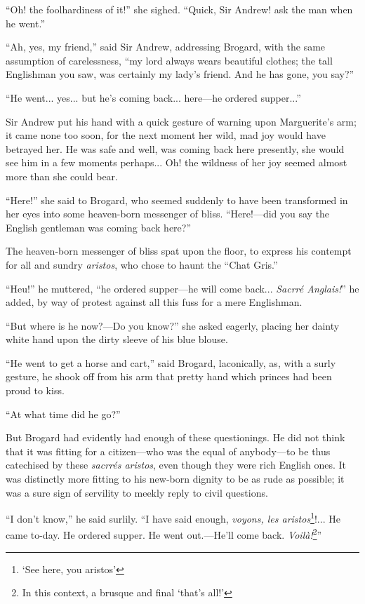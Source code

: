 \documentclass[paper=a5,BCOR=7mm,twoside,DIV=calc,12pt,usegeometry,chapterprefix,endperiod,headings=big]{scrbook}
\begin{document}
\enquote{Oh! the foolhardiness of it!} she sighed. \enquote{Quick, Sir Andrew! ask the man when he went.}

\enquote{Ah, yes, my friend,} said Sir Andrew, addressing Brogard, with the same assumption of carelessness, \enquote{my lord always wears beautiful clothes; the tall Englishman you saw, was certainly my lady's friend. And he has gone, you say?}

\enquote{He went... yes... but he's coming back... here---he ordered supper...}

Sir Andrew put his hand with a quick gesture of warning upon Marguerite's arm; it came none too soon, for the next moment her wild, mad joy would have betrayed her. He was safe and well, was coming back here presently, she would see him in a few moments perhaps... Oh! the wildness of her joy seemed almost more than she could bear.

\enquote{Here!} she said to Brogard, who seemed suddenly to have been transformed in her eyes into some heaven-born messenger of bliss. \enquote{Here!---did you say the English gentleman was coming back here?}

The heaven-born messenger of bliss spat upon the floor, to express his contempt for all and sundry \textit{aristos}, who chose to haunt the \enquote{Chat Gris.}

\enquote{Heu!} he muttered, \enquote{he ordered supper---he will come back... \textit{Sacrré Anglais!}} he added, by way of protest against all this fuss for a mere Englishman.

\enquote{But where is he now?---Do you know?} she asked eagerly, placing her dainty white hand upon the dirty sleeve of his blue blouse.

\enquote{He went to get a horse and cart,} said Brogard, laconically, as, with a surly gesture, he shook off from his arm that pretty hand which princes had been proud to kiss.

\enquote{At what time did he go?}

But Brogard had evidently had enough of these questionings. He did not think that it was fitting for a citizen---who was the equal of anybody---to be thus catechised by these \textit{sacrrés aristos}, even though they were rich English ones. It was distinctly more fitting to his new-born dignity to be as rude as possible; it was a sure sign of servility to meekly reply to civil questions.

\enquote{I don't know,} he said surlily. \enquote{I have said enough, \textit{voyons, les aristos}\footnote{\enquote{See here, you aristos}}!... He came to-day. He ordered supper. He went out.---He'll come back. \textit{Voilà!}\footnote{In this context, a brusque and final \enquote{that's all!}}}
\end{document}
